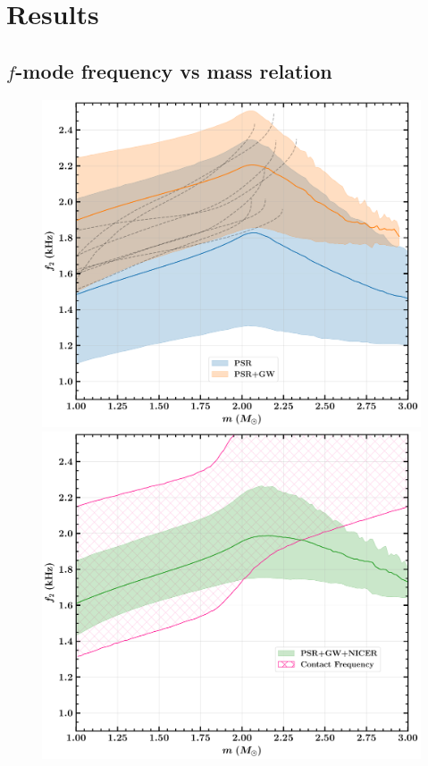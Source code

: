 \documentclass[aps,prd,twocolumn,superscriptaddress,footinbib]{revtex4-1}
\begin{document}
\section{Results} \label{sec:results}

\subsection{$f$-mode frequency vs mass relation}

\begin{figure}
    \centering
    \includegraphics[width=\linewidth]{Full_GR/Envelope_plot1.pdf} \\
    \includegraphics[width=\linewidth]{Full_GR/Envelope_plot2.pdf}

\end{figure}
\end{document}
